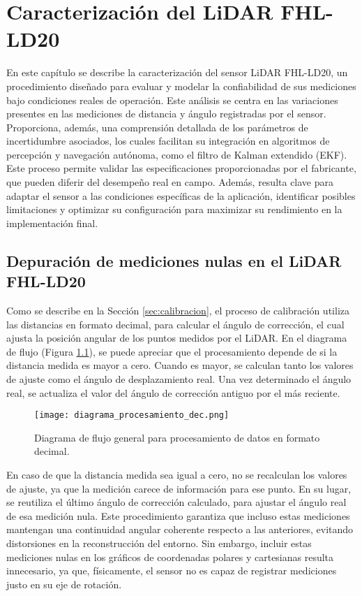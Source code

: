 \chapter{Caracterización del LiDAR FHL-LD20}
\label{caracterizacion}
En este capítulo se describe la caracterización del sensor LiDAR FHL-LD20, un procedimiento diseñado para evaluar y modelar la confiabilidad de sus mediciones bajo condiciones reales de operación. Este análisis se centra en las variaciones presentes en las mediciones de distancia y ángulo registradas por el sensor. Proporciona, además, una comprensión detallada de los parámetros de incertidumbre asociados, los cuales facilitan su integración en algoritmos de percepción y navegación autónoma, como el filtro de Kalman extendido (EKF). Este proceso permite validar las especificaciones proporcionadas por el fabricante, que pueden diferir del desempeño real en campo. Además, resulta clave para adaptar el sensor a las condiciones específicas de la aplicación, identificar posibles limitaciones y optimizar su configuración para maximizar su rendimiento en la implementación final.

\section{Depuración de mediciones nulas en el LiDAR FHL-LD20}
Como se describe en la Sección \ref{sec:calibracion}, el proceso de calibración utiliza las distancias en formato decimal, para calcular el ángulo de corrección, el cual ajusta la posición angular de los puntos medidos por el LiDAR. En el diagrama de flujo (Figura \ref{fig:diagrama_procesamiento_dec}), se puede apreciar que el procesamiento depende de si la distancia medida es mayor a cero. Cuando es mayor, se calculan tanto los valores de ajuste como el ángulo de desplazamiento real. Una vez determinado el ángulo real, se actualiza el valor del ángulo de corrección antiguo por el más reciente.

\begin{figure}[H]
	\centering
	\texttt{[image: diagrama\_procesamiento\_dec.png]}
	\caption{Diagrama de flujo general para procesamiento de datos en formato decimal.}
	\label{fig:diagrama_procesamiento_dec}
\end{figure}

En caso de que la distancia medida sea igual a cero, no se recalculan los valores de ajuste, ya que la medición carece de información para ese punto. En su lugar, se reutiliza el último ángulo de corrección calculado, para ajustar el ángulo real de esa medición nula. Este procedimiento garantiza que incluso estas mediciones mantengan una continuidad angular coherente respecto a las anteriores, evitando distorsiones en la reconstrucción del entorno. Sin embargo, incluir estas mediciones nulas en los gráficos de coordenadas polares y cartesianas resulta innecesario, ya que, físicamente, el sensor no es capaz de registrar mediciones justo en su eje de rotación. 

